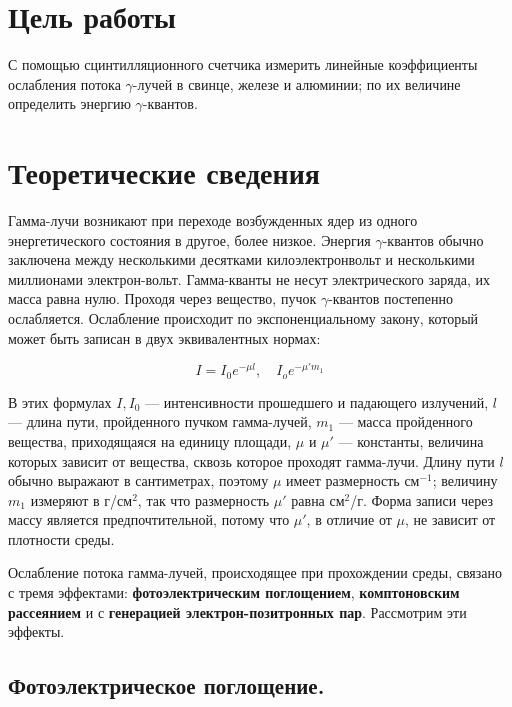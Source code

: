 \documentclass[a4paper,12pt]{article} %
\begin{document}
\section{Цель работы}
С помощью сцинтилляционного счетчика измерить линейные коэффициенты ослабления потока $ \gamma $-лучей в свинце, железе и алюминии; по их величине определить энергию $ \gamma $-квантов.
	
\section{Теоретические сведения}
\noindent Гамма-лучи возникают при переходе возбужденных ядер из одного энергетического состояния в другое, более низкое. Энергия $ \gamma $-квантов обычно заключена между несколькими десятками килоэлектронвольт и несколькими миллионами электрон-вольт. Гамма-кванты не несут электрического заряда, их масса равна нулю. Проходя через вещество, пучок $ \gamma $-квантов постепенно ослабляется. Ослабление происходит по экспоненциальному закону, который может быть записан в двух эквивалентных нормах:
	
	\begin{equation}\label{I(mu)}
	I = I_0 e^{-\mu l}, \quad I_o e^{-\mu 'm_1} 
	\end{equation}
	
	\medskip
	
\noindent В этих формулах $ I, I_0 $ --- интенсивности прошедшего и падающего излучений, $ l $ --- длина пути, пройденного пучком гамма-лучей, $ m_1 $ ---
	масса пройденного вещества, приходящаяся на единицу площади, $ \mu $ и
	$ \mu' $ --- константы, величина которых зависит от вещества, сквозь которое проходят гамма-лучи. Длину пути $ l $ обычно выражают в сантиметрах,
	поэтому $ \mu $ имеет размерность см$ ^{-1} $; величину $ m_1 $ измеряют в г/см$ ^2 $,
	так что размерность $ \mu' $ равна см$ ^2 $/г. Форма записи через массу является предпочтительной, потому что $ \mu' $, в отличие от $ \mu $, не зависит от плотности среды. 
	
	\medskip
	
\noindent Ослабление потока гамма-лучей, происходящее при прохождении среды, связано с тремя эффектами: \textbf{фотоэлектрическим поглощением},
	\textbf{комптоновским рассеянием} и с \textbf{генерацией электрон-позитронных пар}. Рассмотрим эти эффекты.
	
	\subsection{Фотоэлектрическое поглощение.} 
	
\end{document}
